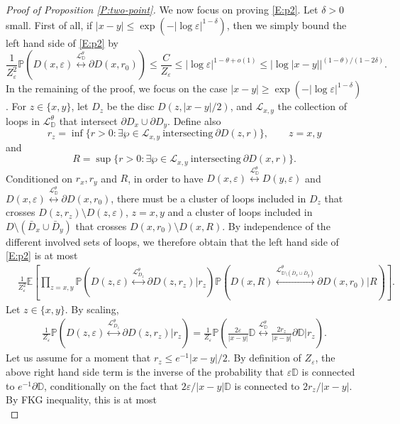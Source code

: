 \documentclass[11pt]{article}
\theoremstyle{remark}
\newcommand{\D}{\mathbb{D}}
\newcommand{\Lc}{\mathcal{L}}
\newcommand{\Expect}[1]{\mathbb{E} \left[ #1 \right] }
\newcommand{\Prob}[1]{\mathbb{P} \left( #1 \right) }
\newcommand{\eps}{\varepsilon}
\numberwithin{equation}{section}
\begin{document}
\begin{proof}[Proof of Proposition \ref{P:two-point}]
We now focus on proving \eqref{E:p2}.
Let $\delta >0$ small. First of all, if $|x-y| \leq \exp \left( - |\log \eps|^{1-\delta} \right)$, then we simply bound the left hand side of \eqref{E:p2} by
\[
\frac{1}{Z_\eps^2} \Prob{ D(x,\eps) \overset{\Lc_\D^\theta}{\longleftrightarrow} \partial D(x,r_0) } \leq \frac{C}{Z_\eps} \leq |\log \eps|^{1-\theta+o(1)} \leq |\log |x-y||^{(1-\theta)/(1-2\delta)}.
\]
In the remaining of the proof, we focus on the case $|x-y| \geq \exp \left( - |\log \eps|^{1-\delta} \right)$.
For $z \in \{x,y\}$, let $D_z$ be the disc $D(z,|x-y|/2)$, and $\Lc_{x,y}$ the collection of loops in $\Lc_\D^\theta$ that intersect $\partial D_x \cup \partial D_y$. Define also
\[
r_z = \inf \{ r >0: \exists \wp \in \Lc_{x,y} \mathrm{~intersecting~} \partial D(z,r) \}, \quad \quad z = x,y
\]
and
\[
R = \sup \{ r >0: \exists \wp \in \Lc_{x,y} \mathrm{~intersecting~} \partial D(x,r) \}.
\]
Conditioned on $r_x, r_y$ and $R$, in order to have $D(x,\eps) \overset{\Lc_\D^\theta}{\longleftrightarrow} D(y,\eps)$ and $D(x,\eps) \overset{\Lc_\D^\theta}{\longleftrightarrow} \partial D(x,r_0)$, there must be a cluster of loops included in $D_z$ that crosses $D(z,r_z) \setminus D(z,\eps)$, $z = x,y$ and a cluster of loops included in $D \setminus (\bar{D}_x \cup \bar{D}_y)$ that crosses $D(x,r_0) \setminus D(x,R)$.
By independence of the different involved sets of loops, we therefore obtain that the left hand side of \eqref{E:p2} is at most
\begin{align*}
& \frac{1}{Z_\eps^2} \Expect{ \prod_{z=x,y} \Prob{ D(z,\eps) \overset{\Lc_{D_z}^\theta}{\longleftrightarrow} \partial D(z,r_z) \Big\vert r_z } \Prob{ D(x,R) \overset{\Lc_{\D \setminus (\bar{D}_x \cup \bar{D}_y)}^\theta}{\longleftrightarrow} \partial D(x,r_0) \Big\vert R } }.
\end{align*}
Let $z \in \{x,y\}$.  By scaling,
\begin{align*}
\frac{1}{Z_\eps} \Prob{ D(z,\eps) \overset{\Lc_{D_z}^\theta}{\longleftrightarrow} \partial D(z,r_z) \Big\vert r_z }
= \frac{1}{Z_\eps} \Prob{ \frac{2\eps}{|x-y|} \D \overset{\Lc_{\D}^\theta}{\longleftrightarrow} \frac{2r_z}{|x-y|} \partial \D \Big\vert r_z }.
\end{align*}
Let us assume for a moment that $r_z \leq e^{-1} |x-y| / 2$. By definition of $Z_\eps$, the above right hand side term is the inverse of the probability that $\eps \D$ is connected to $e^{-1} \partial \D$, conditionally on the fact that $2 \eps/ |x-y| \D$ is connected to $2r_z/|x-y|$. By FKG inequality, this is at most
\begin{equation}

\end{equation}
\end{proof}
\end{document}
